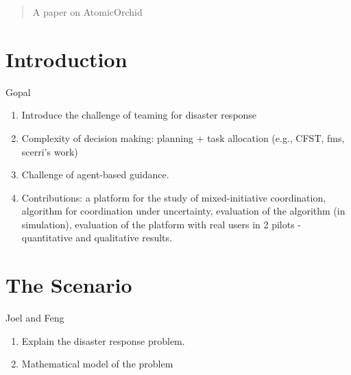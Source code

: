 \documentclass{aamas2014}
\begin{document}
\begin{abstract}
A paper on AtomicOrchid
\end{abstract}








\section{Introduction}
Gopal
\begin{enumerate}
\item Introduce the challenge of teaming for disaster response
\item Complexity of decision making: planning + task allocation (e.g., CFST, fms, scerri's work)
\item Challenge of agent-based guidance.
\item Contributions: a platform for the study of mixed-initiative coordination, algorithm for coordination under uncertainty, evaluation of the algorithm (in simulation), evaluation of the platform with real users in 2 pilots - quantitative and qualitative results.
\end{enumerate}
\section{The Scenario}
Joel and Feng
\begin{enumerate}
\item Explain the disaster response problem.
\item Mathematical model of the problem
\end{enumerate}
\end{document}
